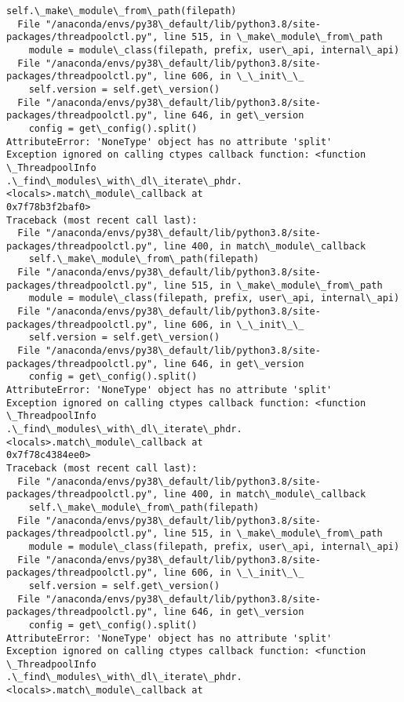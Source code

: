 \documentclass[11pt]{article}
\begin{document}
\begin{Verbatim}[commandchars=\\\{\}]
    self.\_make\_module\_from\_path(filepath)
  File "/anaconda/envs/py38\_default/lib/python3.8/site-
packages/threadpoolctl.py", line 515, in \_make\_module\_from\_path
    module = module\_class(filepath, prefix, user\_api, internal\_api)
  File "/anaconda/envs/py38\_default/lib/python3.8/site-
packages/threadpoolctl.py", line 606, in \_\_init\_\_
    self.version = self.get\_version()
  File "/anaconda/envs/py38\_default/lib/python3.8/site-
packages/threadpoolctl.py", line 646, in get\_version
    config = get\_config().split()
AttributeError: 'NoneType' object has no attribute 'split'
Exception ignored on calling ctypes callback function: <function \_ThreadpoolInfo
.\_find\_modules\_with\_dl\_iterate\_phdr.<locals>.match\_module\_callback at
0x7f78b3f2baf0>
Traceback (most recent call last):
  File "/anaconda/envs/py38\_default/lib/python3.8/site-
packages/threadpoolctl.py", line 400, in match\_module\_callback
    self.\_make\_module\_from\_path(filepath)
  File "/anaconda/envs/py38\_default/lib/python3.8/site-
packages/threadpoolctl.py", line 515, in \_make\_module\_from\_path
    module = module\_class(filepath, prefix, user\_api, internal\_api)
  File "/anaconda/envs/py38\_default/lib/python3.8/site-
packages/threadpoolctl.py", line 606, in \_\_init\_\_
    self.version = self.get\_version()
  File "/anaconda/envs/py38\_default/lib/python3.8/site-
packages/threadpoolctl.py", line 646, in get\_version
    config = get\_config().split()
AttributeError: 'NoneType' object has no attribute 'split'
Exception ignored on calling ctypes callback function: <function \_ThreadpoolInfo
.\_find\_modules\_with\_dl\_iterate\_phdr.<locals>.match\_module\_callback at
0x7f78c4384ee0>
Traceback (most recent call last):
  File "/anaconda/envs/py38\_default/lib/python3.8/site-
packages/threadpoolctl.py", line 400, in match\_module\_callback
    self.\_make\_module\_from\_path(filepath)
  File "/anaconda/envs/py38\_default/lib/python3.8/site-
packages/threadpoolctl.py", line 515, in \_make\_module\_from\_path
    module = module\_class(filepath, prefix, user\_api, internal\_api)
  File "/anaconda/envs/py38\_default/lib/python3.8/site-
packages/threadpoolctl.py", line 606, in \_\_init\_\_
    self.version = self.get\_version()
  File "/anaconda/envs/py38\_default/lib/python3.8/site-
packages/threadpoolctl.py", line 646, in get\_version
    config = get\_config().split()
AttributeError: 'NoneType' object has no attribute 'split'
Exception ignored on calling ctypes callback function: <function \_ThreadpoolInfo
.\_find\_modules\_with\_dl\_iterate\_phdr.<locals>.match\_module\_callback at

\end{Verbatim}
\end{document}
